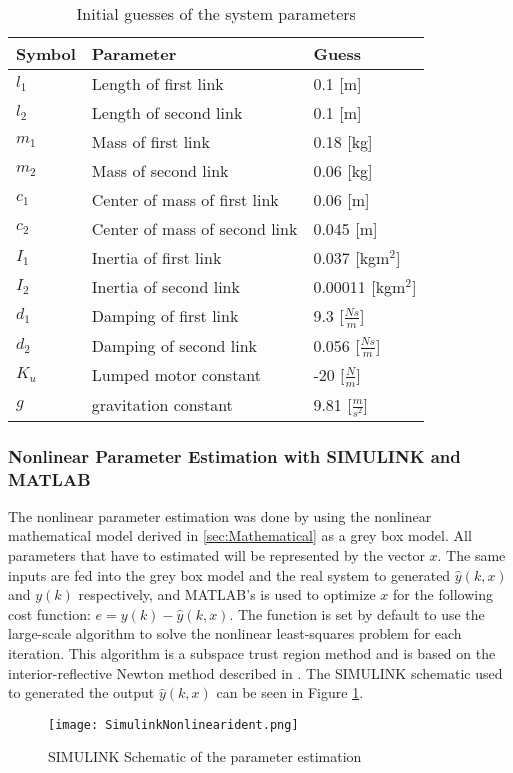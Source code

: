 \documentclass[main.tex]{subfiles}
\begin{document}
\begin{table}[H]
\caption{Initial guesses of the system parameters}
\centering
\begin{tabular}{|l|l|l|}
\hline
Symbol &Parameter &Guess \\ \hline
$l_1$ &Length of first link &0.1 [m] \\ 
$l_2$ &Length of second link &0.1 [m]\\ 
$m_1$ &Mass of first link &0.18 [kg]\\ 
$m_2$ &Mass of second link &0.06 [kg]\\ 
$c_1$ &Center of mass of first link &0.06 [m]\\ 
$c_2$ &Center of mass of second link &0.045 [m]\\ 
$I_1$ &Inertia of first link &0.037 [kgm$^2$]\\ 
$I_2$ &Inertia of second link &0.00011 [kgm$^2$]\\
$d_1$ &Damping of first link &9.3 [$\frac{Ns}{m}$]\\
$d_2$ &Damping of second link &0.056 [$\frac{Ns}{m}$]\\
$K_u$ &Lumped motor constant &-20 [$\frac{N}{m}$]\\
$g$ & gravitation constant & 9.81 [$\frac{m}{s^2}$]\\ \hline
\end{tabular}
\label{tab:initialguesses}
\end{table} 
\subsubsection{Nonlinear Parameter Estimation with SIMULINK\textsuperscript{\textregistered} and MATLAB\textsuperscript{\textregistered}} 
The nonlinear parameter estimation was done by using the nonlinear mathematical model derived in \ref{sec:Mathematical} as a grey box model. All parameters that have to estimated will be represented by the vector $x$. The same inputs are fed into  the grey box model and the real system to generated $\hat{y}(k,x)$ and $y(k)$ respectively, and MATLAB\textsuperscript{\textregistered}'s  is used to optimize $x$ for the following cost function: $e=y(k)-\hat{y}(k,x)$. The  function is set by default to use the large-scale algorithm to solve the nonlinear least-squares problem for each iteration. This algorithm is a subspace trust region method and is based on the interior-reflective Newton method described in \cite{interior}. The SIMULINK\textsuperscript{\textregistered} schematic used to generated the output $\hat{y}(k,x)$ can be seen in Figure \ref{fig:parametersimulink}. 
\begin{figure}[ht]
\centering
\texttt{[image: SimulinkNonlinearident.png]}
\caption{\label{fig:parametersimulink} SIMULINK\textsuperscript{\textregistered} Schematic of the parameter estimation}
\end{figure}
\end{document}
